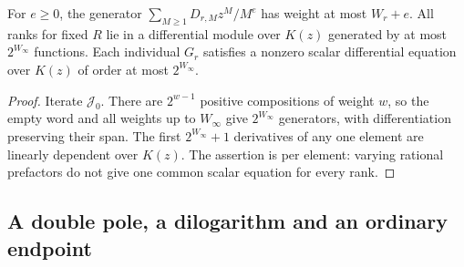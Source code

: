 \begin{corollary}
\label{rha:differential}
For $e\ge0$, the generator $\sum_{M\ge1}D_{r,M}z^M/M^e$ has weight
at most $W_r+e$. All ranks for fixed $R$ lie in a differential module
over $K(z)$ generated by at most $2^{W_\infty}$ functions.
Each individual $G_r$ satisfies a nonzero scalar differential equation
over $K(z)$ of order at most $2^{W_\infty}$.
\end{corollary}
\begin{proof}
Iterate $\mathcal J_0$. There are $2^{w-1}$ positive compositions of
weight $w$, so the empty word and all weights up to $W_\infty$ give
$2^{W_\infty}$ generators, with differentiation preserving their span.
The first $2^{W_\infty}+1$ derivatives of any one element are linearly
dependent over $K(z)$. The assertion is per element: varying rational
prefactors do not give one common scalar equation for every rank.
\end{proof}

\subsection{A double pole, a dilogarithm and an ordinary endpoint}

